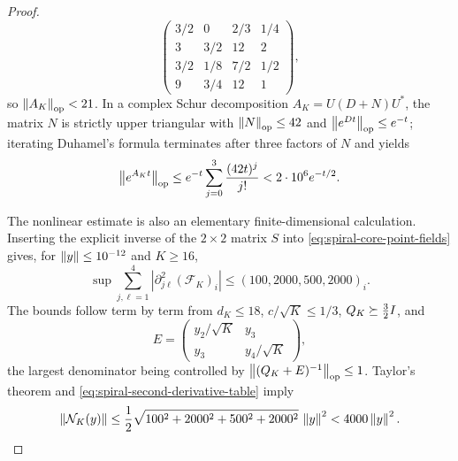 \begin{proof}
\begin{equation*}
\begin{pmatrix}
            3/2&0&2/3&1/4\\
            3&3/2&12&2\\
            3/2&1/8&7/2&1/2\\
            9&3/4&12&1
        \end{pmatrix},
    \end{equation*}
    so $\left\lVert A_K\right\rVert_{\mathrm{op}}<21$. In a complex Schur decomposition $A_K=U(D+N)U^*$, the matrix $N$ is
    strictly upper triangular with $\left\lVert N\right\rVert_{\mathrm{op}}\leq42$ and $\left\lVert e^{Dt}\right\rVert_{\mathrm{op}}\leq e^{-t}$;
    iterating Duhamel's formula terminates after three factors of $N$ and yields
    \begin{equation}\label{eq:spiral-semigroup}
        \left\lVert e^{A_Kt}\right\rVert_{\mathrm{op}}
        \leq e^{-t}\sum_{j=0}^3\frac{(42t)^j}{j!}
        <2\cdot10^6e^{-t/2}.
    \end{equation}

    The nonlinear estimate is also an elementary finite-dimensional calculation. Inserting the
    explicit inverse of the $2\times2$ matrix $S$ into
    \eqref{eq:spiral-core-point-fields} gives, for $\left\lVert y\right\rVert\leq10^{-12}$ and $K\geq16$,
    \begin{equation}\label{eq:spiral-second-derivative-table}
        \sup\sum_{j,\ell=1}^4\left|\partial_{j\ell}^2(\mathcal F_K)_i\right|
        \leq(100,2000,500,2000)_i .
    \end{equation}
    The bounds follow term by term from $d_K\leq18$, $c/\sqrt K\leq1/3$,
    $Q_K\succeq\tfrac32I$, and
    \begin{equation*}
        E=\begin{pmatrix}y_2/\sqrt K&y_3\\y_3&y_4/\sqrt K\end{pmatrix},
    \end{equation*}
    the largest denominator being controlled by $\left\lVert (Q_K+E)^{-1}\right\rVert_{\mathrm{op}}\leq1$. Taylor's
    theorem and \eqref{eq:spiral-second-derivative-table} imply
    \begin{equation}\label{eq:spiral-nonlinear}
        \left\lVert \mathcal N_K(y)\right\rVert
        \leq\frac12\sqrt{100^2+2000^2+500^2+2000^2}\,\left\lVert y\right\rVert^2
        <4000\left\lVert y\right\rVert^2 .
    \end{equation}


\end{proof}
